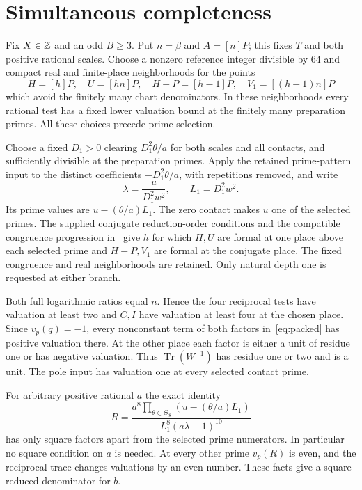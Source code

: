 \documentclass[11pt,a4paper]{article}
\DeclareMathOperator{\Tr}{Tr}\DeclareMathOperator{\Nm}{N}
\begin{document}
\section{Simultaneous completeness}

Fix $X\in\mathbb Z$ and an odd $B\ge3$. Put $n=\beta$ and $A=[n]P$;
this fixes $T$ and both positive rational scales. Choose a nonzero
reference integer divisible by $64$ and compact real and finite-place
neighborhoods for the points
\[
 H=[h]P,\quad U=[hn]P,\quad H-P=[h-1]P,\quad
 V_1=[(h-1)n]P
\]
which avoid the finitely many chart denominators. In these neighborhoods
every rational test has a fixed lower valuation bound at the finitely
many preparation primes. All these choices precede prime selection.

Choose a fixed $D_1>0$ clearing $D_1^2\theta/a$ for both scales and
all contacts, and sufficiently divisible at the preparation primes.
Apply the retained prime-pattern input to the distinct coefficients
$-D_1^2\theta/a$, with repetitions removed, and write
\[
                \lambda=\frac{u}{D_1^2w^2},\qquad L_1=D_1^2w^2.
\]
Its prime values are $u-(\theta/a)L_1$. The zero contact makes $u$
one of the selected primes. The supplied conjugate reduction-order
conditions and the compatible congruence progression in~\cite{Dependencies}
give $h$ for which $H,U$ are formal at one place above each selected
prime and $H-P,V_1$ are formal at the conjugate place. The fixed
congruence and real neighborhoods are retained. Only natural depth one
is requested at either branch.

Both full logarithmic ratios equal $n$. Hence the four reciprocal
tests have valuation at least two and $C,I$ have valuation at least
four at the chosen place. Since $v_p(q)=-1$, every nonconstant term
of both factors in~\eqref{eq:packed} has positive valuation there.
At the other place each factor is either a unit of residue one or has
negative valuation. Thus $\Tr(W^{-1})$ has residue one or two and is
a unit. The pole input has valuation one at every selected contact prime.

For arbitrary positive rational $a$ the exact identity
\begin{equation}\label{eq:primeproduct}
 R=\frac{a^8\prod_{\theta\in\Theta_8}(u-(\theta/a)L_1)}
             {L_1^8(a\lambda-1)^{10}}
\end{equation}
has only square factors apart from the selected prime numerators.
In particular no square condition on $a$ is needed. At every other
prime $v_p(R)$ is even, and the reciprocal trace changes valuations
by an even number. These facts give a square reduced denominator for $b$.
\end{document}
